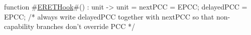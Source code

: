 function #\hyperref[zERETHook]{ERETHook}#() : unit -> unit =
  {
    nextPCC    = EPCC;
    delayedPCC = EPCC; /* always write delayedPCC together with nextPCC so 
                          that non-capability branches don't override PCC */
  }
